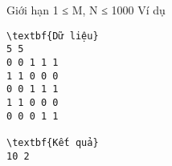 Giới hạn
1 ≤ M, N ≤ 1000
Ví dụ
\begin{verbatim}
\textbf{Dữ liệu}
5 5
0 0 1 1 1 
1 1 0 0 0
0 0 1 1 1
1 1 0 0 0
0 0 0 1 1	

\textbf{Kết quả}
10 2
\end{verbatim}